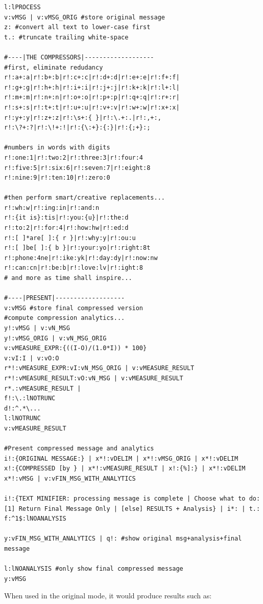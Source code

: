 \documentclass[a4paper, 18pt]{book} %
\begin{document}
{{{{\begin{tcolorbox}[teaterminalstyle, title=TEA Program:  SMS-TEXT MINIFIER v3, breakable]
\begin{lstlisting}[language=TEA,breaklines=true,]
l:lPROCESS
v:vMSG | v:vMSG_ORIG #store original message
z: #convert all text to lower-case first
t.: #truncate trailing white-space

#----|THE COMPRESSORS|-------------------
#first, eliminate redudancy
r!:a+:a|r!:b+:b|r!:c+:c|r!:d+:d|r!:e+:e|r!:f+:f|
r!:g+:g|r!:h+:h|r!:i+:i|r!:j+:j|r!:k+:k|r!:l+:l|
r!:m+:m|r!:n+:n|r!:o+:o|r!:p+:p|r!:q+:q|r!:r+:r|
r!:s+:s|r!:t+:t|r!:u+:u|r!:v+:v|r!:w+:w|r!:x+:x|
r!:y+:y|r!:z+:z|r!:\s+:{ }|r!:\.+:.|r!:,+:,
r!:\?+:?|r!:\!+:!|r!:{\:+}:{:}|r!:{;+}:;

#numbers in words with digits
r!:one:1|r!:two:2|r!:three:3|r!:four:4
r!:five:5|r!:six:6|r!:seven:7|r!:eight:8
r!:nine:9|r!:ten:10|r!:zero:0

#then perform smart/creative replacements...
r!:wh:w|r!:ing:in|r!:and:n
r!:{it is}:tis|r!:you:{u}|r!:the:d
r!:to:2|r!:for:4|r!:how:hw|r!:ed:d
r!:[ ]*are[ ]:{ r }|r!:why:y|r!:ou:u
r!:[ ]be[ ]:{ b }|r!:your:yo|r!:right:8t
r!:phone:4ne|r!:ike:yk|r!:day:dy|r!:now:nw
r!:can:cn|r!:be:b|r!:love:lv|r!:ight:8
# and more as time shall inspire...

#----|PRESENT|-------------------
v:vMSG #store final compressed version
#compute compression analytics...
y!:vMSG | v:vN_MSG
y!:vMSG_ORIG | v:vN_MSG_ORIG
v:vMEASURE_EXPR:{((I-O)/(1.0*I)) * 100}
v:vI:I | v:vO:O
r*!:vMEASURE_EXPR:vI:vN_MSG_ORIG | v:vMEASURE_RESULT
r*!:vMEASURE_RESULT:vO:vN_MSG | v:vMEASURE_RESULT
r*.:vMEASURE_RESULT | 
f!:\.:lNOTRUNC
d!:^.*\...
l:lNOTRUNC
v:vMEASURE_RESULT

#Present compressed message and analytics
i!:{ORIGINAL MESSAGE:} | x*!:vDELIM | x*!:vMSG_ORIG | x*!:vDELIM 
x!:{COMPRESSED [by } | x*!:vMEASURE_RESULT | x!:{%]:} | x*!:vDELIM 
x*!:vMSG | v:vFIN_MSG_WITH_ANALYTICS

i!:{TEXT MINIFIER: processing message is complete | Choose what to do:
[1] Return Final Message Only | [else] RESULTS + Analysis} | i*: | t.:
f:^1$:lNOANALYSIS

y:vFIN_MSG_WITH_ANALYTICS | q!: #show original msg+analysis+final message

l:lNOANALYSIS #only show final compressed message
y:vMSG
   \end{lstlisting}
  \end{tcolorbox}
  \caption{TEA APPLICATION: SMS/TEXT MINIFIER v3}
  \label{FIGR2}
}


\vspace{2em}

When used in the original mode, it would produce results such as:


}}}
\end{document}
